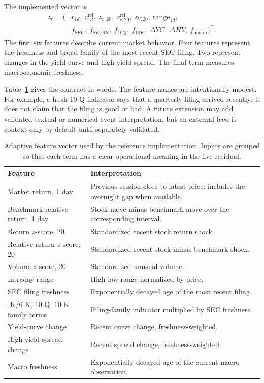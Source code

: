 \documentclass[11pt]{article}
\begin{document}
The implemented vector is
\begin{equation}
\begin{split}
z_t=(&r_{1d},\ r_{1d}^{\mathrm{rel}},\ z_{r,20},\ z_{r,20}^{\mathrm{rel}},\ z_{V,20},\ \mathrm{range}_{1d},\\
&f_{\mathrm{SEC}},\ f_{8K/6K},\ f_{10Q},\ f_{10K},\ \Delta YC,\ \Delta HY,\ f_{\mathrm{macro}})^\top.
\end{split}
\label{eq:featurevector}
\end{equation}
The first six features describe current market behavior. Four features represent the freshness and broad family of the most recent SEC filing. Two represent changes in the yield curve and high-yield spread. The final term measures macroeconomic freshness.

Table~\ref{tab:features} gives the contract in words. The feature names are intentionally modest. For example, a fresh 10-Q indicator says that a quarterly filing arrived recently; it does not claim that the filing is good or bad. A future extension may add validated textual or numerical event interpretation, but an external feed is context-only by default until separately validated.

\begin{table}[tbp]
\centering
\small
\caption{Adaptive feature vector used by the reference implementation. Inputs are grouped so that each term has a clear operational meaning in the live residual.}
\label{tab:features}
\begin{tabularx}{\textwidth}{@{}>{\raggedright\arraybackslash}p{}X@{}}
\toprule
Feature & Interpretation \\
\midrule
Market return, 1 day & Previous session close to latest price; includes the overnight gap when available. \\
Benchmark-relative return, 1 day & Stock move minus benchmark move over the corresponding interval. \\
Return $z$-score, 20 & Standardized recent stock return shock. \\
Relative-return $z$-score, 20 & Standardized recent stock-minus-benchmark shock. \\
Volume $z$-score, 20 & Standardized unusual volume. \\
Intraday range & High-low range normalized by price. \\
SEC filing freshness & Exponentially decayed age of the most recent filing. \\
8-K/6-K, 10-Q, 10-K-family terms & Filing-family indicator multiplied by SEC freshness. \\
Yield-curve change & Recent curve change, freshness-weighted. \\
High-yield spread change & Recent spread change, freshness-weighted. \\
Macro freshness & Exponentially decayed age of the current macro observation. \\
\bottomrule
\end{tabularx}
\end{table}
\end{document}
